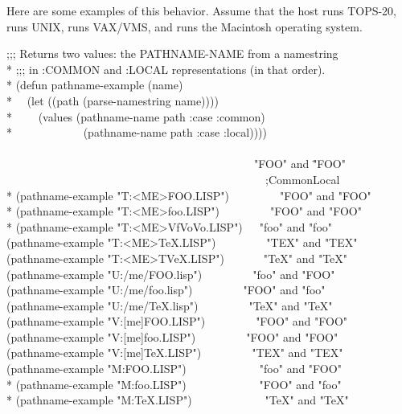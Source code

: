 \newpage%

Here are some examples of this behavior.  Assume that the host  runs
TOPS-20,  runs UNIX,  runs VAX/VMS, and  runs the Macintosh
operating system.
\begin{lisp}
;;; Returns two values: the PATHNAME-NAME from a namestring \\*
;;; in :COMMON and :LOCAL representations (in that order). \\*
(defun pathname-example (name) \\*
~~(let ((path (parse-namestring name)))) \\*
~~~~(values (pathname-name path :case :common) \\*
~~~~~~~~~~~~(pathname-name path :case :local)))) \\
\\
~~~~~~~~~~~~~~~~~~~~~~~~~~~~~~~~~~~~~~~~~~~\EV\ "FOO" \textrm{and} \="FOO" \kill
~~~~~~~~~~~~~~~~~~~~~~~~~~~~~~~~~~~~~~~~~~~~~~;\textrm{Common}\>\textrm{Local} \\*
(pathname-example "T:<ME>FOO.LISP")~~~~~~~~\EV\ "FOO" \textrm{and} "FOO" \\*
(pathname-example "T:<ME>foo.LISP")~~~~~~~~\EV\ "FOO" \textrm{and} "FOO" \\*
(pathname-example "T:<ME>{\Xcircumflex}Vf{\Xcircumflex}Vo{\Xcircumflex}Vo.LISP")~~\EV\ "foo" \textrm{and} "foo" \\
(pathname-example "T:<ME>TeX.LISP")~~~~~~~~\EV\ "TEX" \textrm{and} "TEX" \\
(pathname-example "T:<ME>T{\Xcircumflex}VeX.LISP")~~~~~~\EV\ "TeX" \textrm{and} "TeX" \\
(pathname-example "U:/me/FOO.lisp")~~~~~~~~\EV\ "foo" \textrm{and} "FOO" \\
(pathname-example "U:/me/foo.lisp")~~~~~~~~\EV\ "FOO" \textrm{and} "foo" \\
(pathname-example "U:/me/TeX.lisp")~~~~~~~~\EV\ "TeX" \textrm{and} "TeX" \\
(pathname-example "V:[me]FOO.LISP")~~~~~~~~\EV\ "FOO" \textrm{and} "FOO" \\
(pathname-example "V:[me]foo.LISP")~~~~~~~~\EV\ "FOO" \textrm{and} "FOO" \\
(pathname-example "V:[me]TeX.LISP")~~~~~~~~\EV\ "TEX" \textrm{and} "TEX" \\
(pathname-example "M:FOO.LISP")~~~~~~~~~~~~\EV\ "foo" \textrm{and} "FOO" \\*
(pathname-example "M:foo.LISP")~~~~~~~~~~~~\EV\ "FOO" \textrm{and} "foo" \\*
(pathname-example "M:TeX.LISP")~~~~~~~~~~~~\EV\ "TeX" \textrm{and} "TeX"
\end{lisp}
